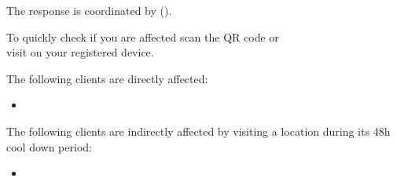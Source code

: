 \documentclass[12pt]{article}
\begin{document}
\title{\vspace{-2cm}}
\author{}
\date{ -  (+h)\vspace{-0.5em}}
\maketitle
\thispagestyle{empty}
The response is coordinated by \textbf{} ().\vspace{1em}

\vspace{1em}

\begin{minipage}{0.3\textwidth}
\begin{center}
\end{center}
\end{minipage}
\hfill
\begin{minipage}{0.7\textwidth}
To quickly check if you are affected scan the QR code or\\ visit \href{\VAR{ qr_code }}{} on your registered device.
\end{minipage}\vspace{1em}

The following clients are directly affected:
\begin{multicols}{5}
\begin{itemize}
  \item {}
\end{itemize}
\end{multicols}

The following clients are indirectly affected by visiting a location during its 48h cool down period:
\begin{multicols}{5}
\begin{itemize}
  \item {}
\end{itemize}
\end{multicols}
\end{document}
